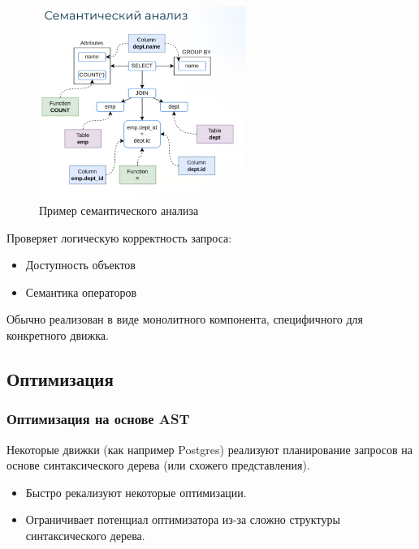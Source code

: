 \documentclass[11pt]{article}
\begin{document}
    \begin{figure}[h!]
        \centering
        \includegraphics[width=0.6\textwidth]{Pictures/Relational algebra/Semantic analysis}
        \caption{Пример семантического анализа}
    \end{figure}

    Проверяет логическую корректность запроса:
    \begin{itemize}
        \item Доступность объектов
        \item Семантика операторов
    \end{itemize}
    Обычно реализован в виде монолитного компонента, специфичного для конкретного движка.

    \subsection*{Оптимизация}

    \subsubsection*{Оптимизация на основе AST}

    Некоторые движки (как например Postgres) реализуют планирование запросов на основе синтаксического дерева (или схожего представления).
    \begin{itemize}[label=+]
        \item Быстро рекализуют некоторые оптимизации.
    \end{itemize}
    \begin{itemize}[label=-]
        \item Ограничивает потенциал оптимизатора из-за сложно структуры синтаксического дерева.
    \end{itemize}
\end{document}
